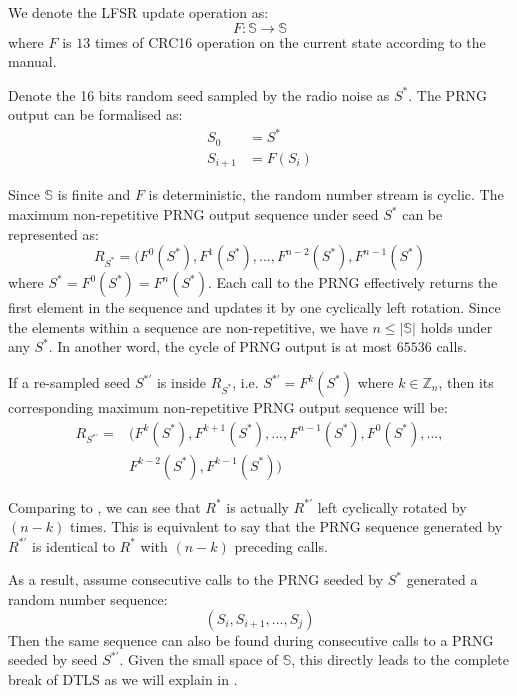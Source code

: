 We denote the LFSR update operation as:
\begin{equation}
F:\mathbb{S} \rightarrow \mathbb{S}
\end{equation}
where $F$ is $13$ times of CRC16 operation on the current state according to the manual.

Denote the 16 bits random seed sampled by the radio noise as $S^*$. The PRNG output can be formalised as:
\begin{equation}
	\begin{aligned}
	S_{0} &= S^* \\
	S_{i+1} &= F(S_{i})
	\end{aligned}
\end{equation}

Since $\mathbb{S}$ is finite and $F$ is deterministic, the random number stream is cyclic. The maximum non-repetitive PRNG output sequence under seed $S^*$ can be represented as:
\begin{equation} \label{R*}
R_{S^*}= (F^0(S^{*}), F^{1}(S^{*}), ..., F^{n-2}(S^{*}), F^{n-1}(S^{*})
\end{equation}
where $S^{*} = F^{0}(S^{*}) = F^{n}(S^{*})$. Each call to the PRNG effectively returns the first element in the sequence and updates it by one cyclically left rotation. Since the elements within a sequence are non-repetitive, we have $n \leq |\mathbb{S}|$ holds under any $S^*$. In another word, the cycle of PRNG output is at most $65536$ calls.

If a re-sampled seed $S^{*'}$ is inside $R_{S^*}$, i.e. $S^{*'} = F^{k}(S^*)$ where $k \in \mathbb{Z}_n$, then its corresponding maximum non-repetitive PRNG output sequence will be:
\begin{equation}\label{R*'}
	\begin{aligned}
	R_{S^{*'}} = &( F^{k}(S^*), F^{k+1}(S^{*}), ..., F^{n-1}(S^*), F^{0}(S^*), ...,\\
	&F^{k-2}(S^{*}), F^{k-1}(S^{*}))
	\end{aligned}
\end{equation}

Comparing  to , we can see that $R^*$ is actually $R^{*'}$ left cyclically rotated by $(n-k)$ times. This is equivalent to say that the PRNG sequence generated by $R^{*'}$ is identical to $R^*$ with $(n-k)$ preceding calls.

 As a result, assume consecutive calls to the PRNG seeded by $S^*$ generated a random number sequence:
\begin{equation*}
(S_i, S_{i+1}, ..., S_{j})
\end{equation*}
Then the same sequence can also be found during consecutive calls to a PRNG seeded by seed $S^{*'}$. Given the small space of $\mathbb{S}$, this directly leads to the complete break of DTLS as we will explain in .

